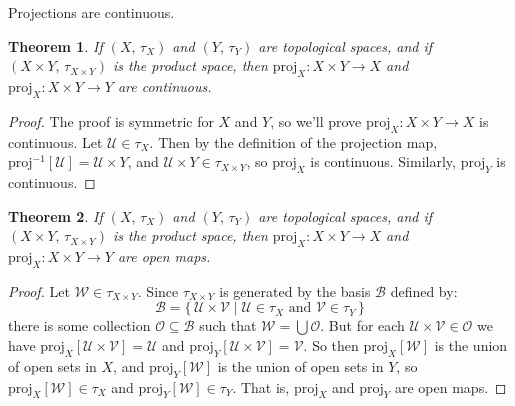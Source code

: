 \documentclass{article}
\theoremstyle{plain}
\newtheorem{theorem}{Theorem}[section]
\theoremstyle{normal}
\begin{document}
        Projections are continuous.
        \begin{theorem}
            If $(X,\,\tau_{X})$ and $(Y,\,\tau_{Y})$ are topological spaces,
            and if $(X\times{Y},\,\tau_{X\times{Y}})$ is the product space,
            then $\textrm{proj}_{X}:X\times{Y}\rightarrow{X}$ and
            $\textrm{proj}_{X}:X\times{Y}\rightarrow{Y}$ are continuous.
        \end{theorem}
        \begin{proof}
            The proof is symmetric for $X$ and $Y$, so we'll prove
            $\textrm{proj}_{X}:X\times{Y}\rightarrow{X}$ is continuous.
            Let $\mathcal{U}\in\tau_{X}$. Then by the definition of the
            projection map,
            $\textrm{proj}^{-1}[\mathcal{U}]=\mathcal{U}\times{Y}$, and
            $\mathcal{U}\times{Y}\in\tau_{X\times{Y}}$, so
            $\textrm{proj}_{X}$ is continuous. Similarly,
            $\textrm{proj}_{Y}$ is continuous.
        \end{proof}
        \begin{theorem}
            If $(X,\,\tau_{X})$ and $(Y,\,\tau_{Y})$ are topological spaces,
            and if $(X\times{Y},\,\tau_{X\times{Y}})$ is the product space,
            then $\textrm{proj}_{X}:X\times{Y}\rightarrow{X}$ and
            $\textrm{proj}_{X}:X\times{Y}\rightarrow{Y}$ are open maps.
        \end{theorem}
        \begin{proof}
            Let $\mathcal{W}\in\tau_{X\times{Y}}$. Since $\tau_{X\times{Y}}$
            is generated by the basis $\mathcal{B}$ defined by:
            \begin{equation}
                \mathcal{B}=\{\,
                    \mathcal{U}\times\mathcal{V}\;|\;
                    \mathcal{U}\in\tau_{X}\textrm{ and }
                    \mathcal{V}\in\tau_{Y}\,\}
            \end{equation}
            there is some collection $\mathcal{O}\subseteq\mathcal{B}$ such
            that $\mathcal{W}=\bigcup\mathcal{O}$. But for each
            $\mathcal{U}\times\mathcal{V}\in\mathcal{O}$ we have
            $\textrm{proj}_{X}[\mathcal{U}\times\mathcal{V}]=\mathcal{U}$ and
            $\textrm{proj}_{Y}[\mathcal{U}\times\mathcal{V}]=\mathcal{V}$.
            So then $\textrm{proj}_{X}[\mathcal{W}]$ is the union of open sets
            in $X$, and $\textrm{proj}_{Y}[\mathcal{W}]$ is the union of open
            sets in $Y$, so $\textrm{proj}_{X}[\mathcal{W}]\in\tau_{X}$ and
            $\textrm{proj}_{Y}[\mathcal{W}]\in\tau_{Y}$. That is,
            $\textrm{proj}_{X}$ and $\textrm{proj}_{Y}$ are open maps.
        \end{proof}
\end{document}
